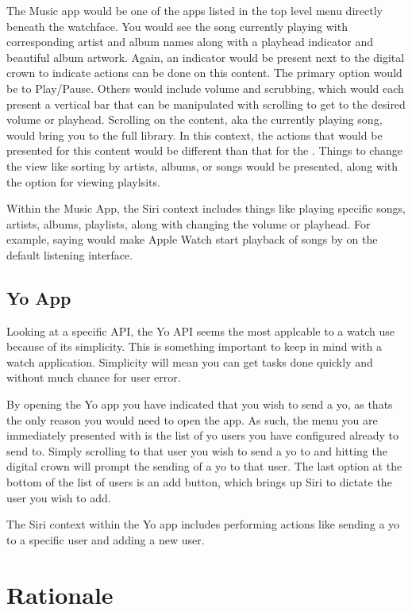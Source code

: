\documentclass[journal,letterpaper]{article}
\begin{document}
    The Music app would be one of the apps listed in the top level menu directly beneath the watchface. You would see the song currently playing with corresponding artist and album names along with a playhead indicator and beautiful album artwork. Again, an indicator would be present next to the digital crown to indicate actions can be done on this content. The primary option would be to Play/Pause. Others would include volume and scrubbing, which would each present a vertical bar that can be manipulated with scrolling to get to the desired volume or playhead. Scrolling on the content, aka the currently playing song, would bring you to the full library. In this context, the actions that would be presented for this content would be different than that for the . Things to change the view like sorting by artists, albums, or songs would be presented, along with the option for viewing playlsits.

    Within the Music App, the Siri context includes things like playing specific songs, artists, albums, playlists, along with changing the volume or playhead. For example, saying  would make Apple Watch start playback of songs by  on the default listening interface. 

    \subsection{Yo App}
    
    Looking at a specific API, the Yo API seems the most applcable to a watch use because of its simplicity. This is something important to keep in mind with a watch application. Simplicity will mean you can get tasks done quickly and without much chance for user error.

    By opening the Yo app you have indicated that you wish to send a yo, as thats the only reason you would need to open the app. As such, the menu you are immediately presented with is the list of yo users you have configured already to send to. Simply scrolling to that user you wish to send a yo to and hitting the digital crown will prompt the sending of a yo to that user. The last option at the bottom of the list of users is an add button, which brings up Siri to dictate the user you wish to add.

    The Siri context within the Yo app includes performing actions like sending a yo to a specific user and adding a new user.

    \section{Rationale}
    \label{rationale}
\end{document}
